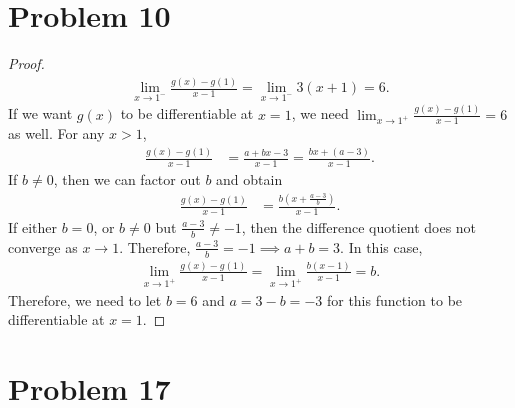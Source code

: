 \documentclass[12pt]{article}
\begin{document}
\section*{Problem 10}

\begin{proof}
  \begin{align*}
    \lim_{x \to 1^-}\frac{g(x)-g(1)}{x-1} = \lim_{x \to 1^-} 3(x+1) = 6.
  \end{align*}
  If we want $g(x)$ to be differentiable at $x=1$, we need $\lim_{x \to 1^+}\frac{g(x)-g(1)}{x-1}=6$ as well. For any $x>1$,
  \begin{align*}
    \frac{g(x)-g(1)}{x-1} &= \frac{a+bx - 3}{x-1} = \frac{bx +(a-3)}{x-1}.
  \end{align*}
  If $b\not=0$, then we can factor out $b$ and obtain
  \begin{align*}
    \frac{g(x)-g(1)}{x-1} &= \frac{b(x +\frac{a-3}{b})}{x-1}.
  \end{align*}
  If either $b=0$, or $b\not=0$ but $\frac{a-3}{b} \not=-1$, then the difference quotient does not converge as $x \rightarrow 1$. Therefore, $\frac{a-3}{b}=-1 \implies   a+b=3$. In this case,
  \begin{align*}
    \lim_{x \to 1^+}\frac{g(x)-g(1)}{x-1} = \lim_{x \to 1^+} \frac{b(x-1)}{x-1} = b.
  \end{align*}
  Therefore, we need to let $b=6$ and $a=3-b=-3$ for this function to be differentiable at $x=1$.
\end{proof}


\section*{Problem 17}
\end{document}
